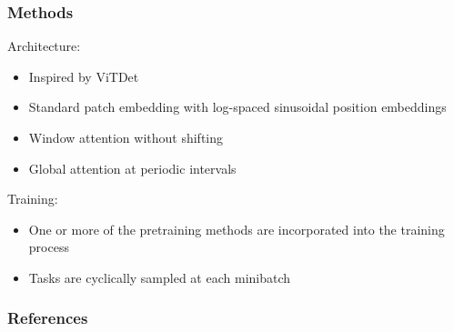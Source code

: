 \documentclass{beamer}
\begin{document}
\begin{frame}
   \frametitle{Methods}
   Architecture:
   \begin{itemize}
        \item Inspired by ViTDet \cite{li2022exploring}
        \item Standard patch embedding with log-spaced sinusoidal position embeddings
        \item Window attention without shifting
        \item Global attention at periodic intervals
   \end{itemize}
   \vspace{1em}
   Training:
   \begin{itemize}
        \item One or more of the pretraining methods are incorporated into the training process
        \item Tasks are cyclically sampled at each minibatch
   \end{itemize}
\end{frame}

\begin{frame}[shrink=30]
   \frametitle{References}
   \printbibliography
\end{frame}
\end{document}
